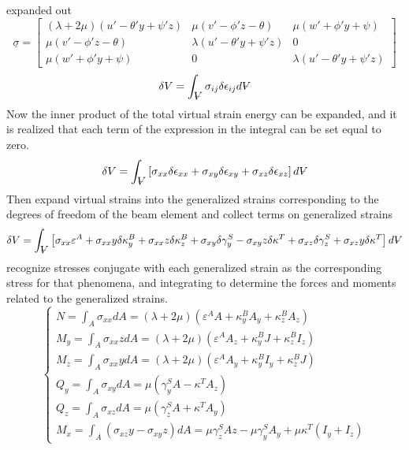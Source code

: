 expanded out 
\begin{equation}\label{StressEvaluated}
\underline{\sigma}=\left[\begin{array}{ccc}
(\lambda+2\mu)(u'-\theta'y+\psi'z)&\mu(v'-\phi'z-\theta)&\mu(w'+\phi'y+\psi)\\
\mu(v'-\phi'z-\theta)&\lambda(u'-\theta'y+\psi'z)&0\\
\mu(w'+\phi'y+\psi)&0&\lambda(u'-\theta'y+\psi'z)
\end{array}\right]
\end{equation}
\begin{equation}\label{eq:TotalVirtualStrainEnergyExpression}
\delta V = \int_{\volume}\sigma_{ij}\delta\epsilon_{ij}d\volume
\end{equation}
Now the inner product of the total virtual strain energy can be expanded, and it is realized that each term of the expression in the integral can be set equal to zero.
\begin{equation}\label{eq:TotalVirtualStrainEnergyExpanded}
\delta V=\int_{\volume}\left[\sigma_{xx}\delta\epsilon_{xx}+\sigma_{xy}\delta\epsilon_{xy}+\sigma_{xz}\delta\epsilon_{xz}\right]d\volume
\end{equation}
Then expand virtual strains into the generalized strains corresponding to the degrees of freedom of the beam element and collect terms on generalized strains
\begin{equation}\label{eq:TotalVirtualStrainEnergyExpandedGeneralized}
\delta V=\int_{\volume}\left[\sigma_{xx}\varepsilon^A+\sigma_{xx}y\delta\kappa^B_y+\sigma_{xx}z\delta\kappa^B_z+\sigma_{xy}\delta\gamma^S_y-\sigma_{xy}z\delta\kappa^T+\sigma_{xz}\delta\gamma^S_z+\sigma_{xz}y\delta\kappa^T\right]d\volume
\end{equation}
recognize stresses conjugate with each generalized strain as the corresponding stress for that phenomena, and integrating to determine the forces and moments related to the generalized strains.
\begin{equation}\label{eq:generalizedForces}
\left\{\begin{array}{l}
N=\int_A\sigma_{xx}dA=(\lambda+2\mu)(\varepsilon^AA+\kappa^B_yA_y+\kappa^B_zA_z)\\
M_y=\int_A\sigma_{xx}zdA=(\lambda+2\mu)(\varepsilon^AA_z+\kappa^B_yJ+\kappa^B_zI_z)\\
M_z=\int_A\sigma_{xx}ydA=(\lambda+2\mu)(\varepsilon^AA_y+\kappa^B_yI_y+\kappa^B_zJ)\\
Q_y=\int_A\sigma_{xy}dA=\mu(\gamma^S_yA-\kappa^TA_z)\\
Q_z=\int_A\sigma_{xz}dA=\mu(\gamma^S_zA+\kappa^TA_y)\\
M_x=\int_A(\sigma_{xz}y-\sigma_{xy}z)dA=\mu\gamma^S_zAz-\mu\gamma^S_yA_y+\mu\kappa^T(I_y+I_z)
\end{array}\right.
\end{equation}


